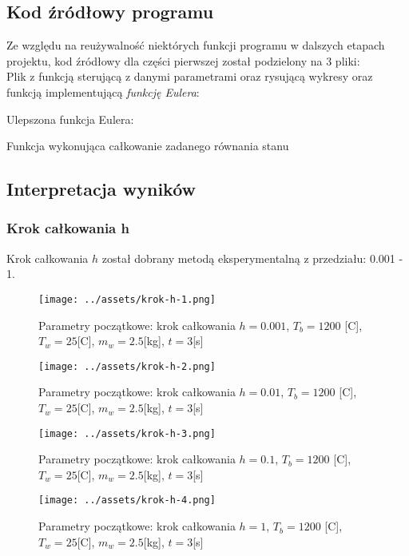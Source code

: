 \documentclass[
	12pt, %
]{fphw}
\begin{document}
\subsection{Kod źródłowy programu}
Ze względu na reużywalność niektórych funkcji programu w dalszych etapach projektu,
kod źródłowy dla części pierwszej został podzielony na 3 pliki: \\
Plik z funkcją sterującą z danymi parametrami oraz rysującą wykresy
oraz funkcją implementującą \textit{funkcję Eulera}:

Ulepszona funkcja Eulera:

Funkcja wykonująca całkowanie zadanego równania stanu

\subsection{Interpretacja wyników}

\subsubsection{Krok całkowania h}
Krok całkowania \(h\) został dobrany metodą eksperymentalną z przedziału: 0.001 - 1.

\begin{figure}[H]
	\texttt{[image: ../assets/krok-h-1.png]}
	\caption{Parametry początkowe: krok całkowania \(h = 0.001\), \(T_b = 1200\) [\textdegree{}C], \(T_w = 25\)[\textdegree{}C], \(m_w = 2.5\)[kg], \(t = 3\)[s]}
	\label{fig:krok-1}
\end{figure}

\begin{figure}[H]
	\texttt{[image: ../assets/krok-h-2.png]}
	\caption{Parametry początkowe: krok całkowania \(h = 0.01\), \(T_b = 1200\) [\textdegree{}C], \(T_w = 25\)[\textdegree{}C], \(m_w = 2.5\)[kg], \(t = 3\)[s]}
	\label{fig:krok-2}

	\texttt{[image: ../assets/krok-h-3.png]}
	\caption{Parametry początkowe: krok całkowania \(h = 0.1\), \(T_b = 1200\) [\textdegree{}C], \(T_w = 25\)[\textdegree{}C], \(m_w = 2.5\)[kg], \(t = 3\)[s]}
	\label{fig:krok-3}
\end{figure}

\begin{figure}[H]
	\texttt{[image: ../assets/krok-h-4.png]}
	\caption{Parametry początkowe: krok całkowania \(h = 1\), \(T_b = 1200\) [\textdegree{}C], \(T_w = 25\)[\textdegree{}C], \(m_w = 2.5\)[kg], \(t = 3\)[s]}
	\label{fig:krok-4}
\end{figure}
\end{document}
